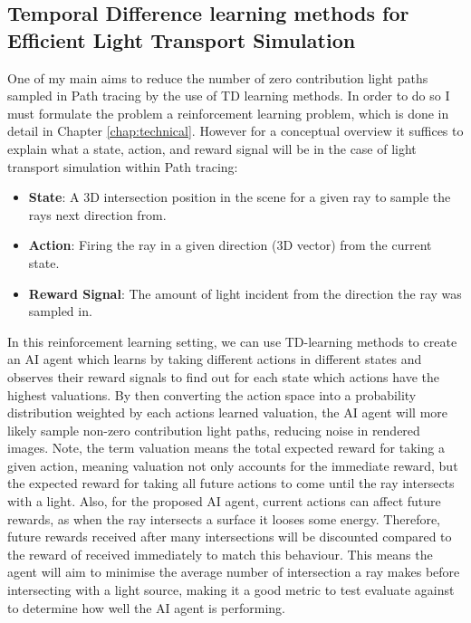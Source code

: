 \documentclass[ %
                    author={Callum Pearce},
                supervisor={Dr. Neill Campbell},
                    degree={MEng},
                     title={How effective are Temporal difference learning methods for reducing the number of zero contribution light paths while still accurately approximating Global Illumination in Path tracing?},
                  subtitle={},
                      type={research},
                      year={2019} ]{dissertation}
\begin{document}
\subsection{Temporal Difference learning methods for Efficient Light Transport Simulation}

One of my main aims to reduce the number of zero contribution light paths sampled 
in Path tracing by the use of TD learning methods. In order to do so I must formulate 
the problem a reinforcement learning problem, which is done in detail in Chapter
\ref{chap:technical}. However for a conceptual overview it suffices to explain what a 
state, action, and reward signal will be in the case of light transport simulation within 
Path tracing:

\begin{itemize}

\item \textbf{State}: A 3D intersection position in the scene for a given ray to sample 
the rays next direction from. 

\item \textbf{Action}: Firing the ray in a given direction (3D vector) from the current 
state.

\item \textbf{Reward Signal}: The amount of light incident from the direction the ray 
was sampled in.

\end{itemize}

In this reinforcement learning setting, we can use TD-learning methods to create 
an AI agent which learns by taking different actions in different states and observes 
their reward signals to find out for each state which actions have the highest valuations.
By then converting the action space into a probability distribution weighted by each
actions learned valuation, the AI agent will more likely sample non-zero contribution 
light paths, reducing noise in rendered images. Note, the term valuation means the 
total expected reward for taking a given action, meaning valuation not only accounts 
for the immediate reward, but the expected reward for taking all future actions to come 
until the ray intersects with a light. Also, for the proposed AI agent, current actions 
can affect future rewards, as when the ray intersects a surface it looses some energy. 
Therefore, future rewards received after many intersections will be discounted 
compared to the reward of received immediately to match this behaviour. This means 
the agent will aim to minimise the average number of intersection a ray makes before 
intersecting with a light source, making it a good metric to test evaluate against to 
determine how well the AI agent is performing.
\end{document}
